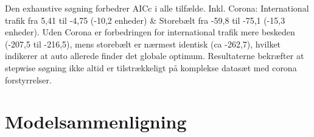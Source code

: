 \documentclass[
  danish,
]{article}
\begin{document}
\begin{table}
{}

\end{table}%

Den exhaustive søgning forbedrer AICc i alle tilfælde. Inkl. Corona:
International trafik fra 5,41 til -4,75 (-10,2 enheder) \& Storebælt fra
-59,8 til -75,1 (-15,3 enheder). Uden Corona er forbedringen for
international trafik mere beskeden (-207,5 til -216,5), mens storebælt
er nærmest identisk (ca -262,7), hvilket indikerer at auto allerede
finder det globale optimum. Resultaterne bekræfter at stepwise søgning
ikke altid er tilstrækkeligt på komplekse datasæt med corona
forstyrrelser.

\section{Modelsammenligning}\label{modelsammenligning}
\end{document}
